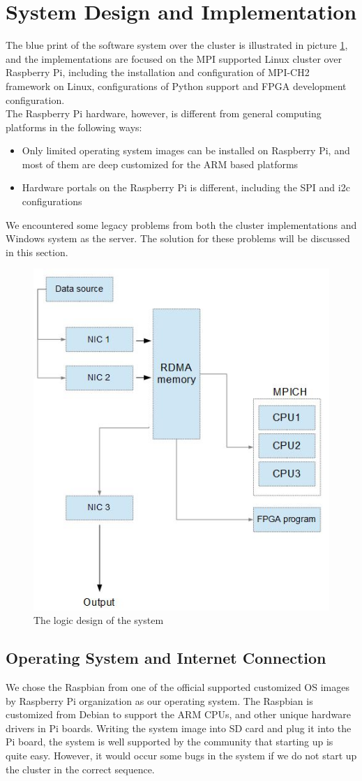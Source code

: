 \documentclass[11pt,openright,a4paper]{report}
\begin{document}
\section{System Design and Implementation}
The blue print of the software system over the cluster is illustrated in picture \ref{fig:LogicDesign}, and the implementations are focused on the MPI supported Linux cluster over Raspberry Pi, including the installation and configuration of MPI-CH2 framework on Linux, configurations of Python support and FPGA development configuration.\\
The Raspberry Pi hardware, however, is different from general computing platforms in the following ways:
\begin{itemize}
	\item Only limited operating system images can be installed on Raspberry Pi, and most of them are deep customized for the ARM based platforms
	\item Hardware portals on the Raspberry Pi is different, including the SPI and i2c configurations
\end{itemize}
We encountered some legacy problems from both the cluster implementations and Windows system as the server. The solution for these problems will be discussed in this section.\\
\begin{figure}[H]
	\centering
	\includegraphics[width=0.5\linewidth]{picture/LogicDesign}
	\caption{The logic design of the system}
	\label{fig:LogicDesign}
\end{figure}
\subsection{Operating System and Internet Connection}
We chose the Raspbian from one of the official supported customized OS images by Raspberry Pi organization as our operating system. The Raspbian is customized from Debian to support the ARM CPUs, and other unique hardware drivers in Pi boards\cite{harrington2015learning}. Writing the system image into SD card and plug it into the Pi board, the system is well supported by the community that starting up is quite easy. However, it would occur some bugs in the system if we do not start up the cluster in the correct sequence.\\
\end{document}
